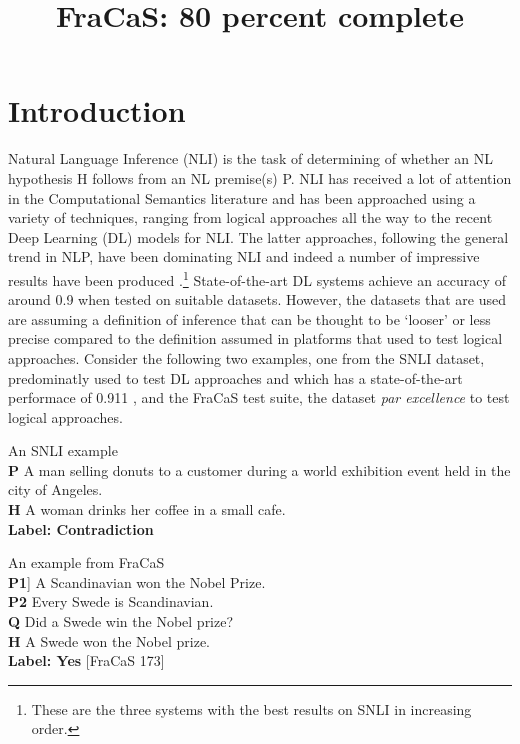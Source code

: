 \documentclass{article}
\title{FraCaS: 80 percent complete}
\begin{document}
\section{Introduction}
Natural Language Inference (NLI) is the task of determining of whether an NL hypothesis H follows from an NL premise(s) P. NLI has received a lot of attention in the Computational Semantics literature and has been approached using a variety of techniques, ranging from logical approaches  \citet{bos:2008,Mineshima:2015,Abzianidze:2015,bernardy_type_2017} all the way to the recent Deep Learning (DL) models for NLI. The latter approaches, following the general trend in NLP, have been dominating NLI and indeed a number of impressive results have been produced \citet{kim:2018,radford:2018,liu:2019}.\footnote{These are the three systems with the best results on SNLI in increasing order.} State-of-the-art DL systems achieve an accuracy of around 0.9 when tested on suitable datasets. However, the datasets that are used are assuming a definition of inference that can be thought to be `looser' or less precise compared to the definition assumed in platforms that used to test logical approaches. Consider the following two examples, one from the SNLI dataset, predominatly used to test DL approaches and which has a state-of-the-art performace of 0.911 \citet{lui:2019'}, and the FraCaS test suite, the dataset \textit{par excellence} to test logical approaches. 


\begin{lingex}
\item An SNLI example \\
\textbf{P}  A  man selling donuts to a customer during a world
exhibition event held in the city of Angeles. \\
 \textbf{H}  A woman drinks her coffee in a small cafe.\\
\textbf{Label: Contradiction}
\end{lingex}


\begin{lingex}
\item An example from FraCaS\\

\textbf{P1}] A Scandinavian won the Nobel Prize.\\
\textbf{P2}	Every Swede is  Scandinavian.\\
\textbf{Q}  Did a Swede win the Nobel prize? \\
\textbf{H} A Swede won the Nobel prize.\\
\textbf{Label: Yes} [FraCaS 173]
\end{lingex}
\end{document}
